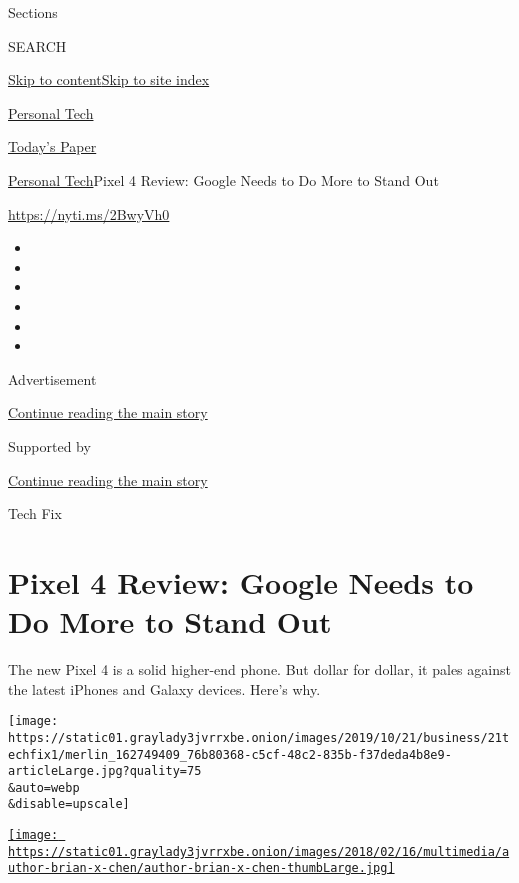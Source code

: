 Sections

SEARCH

\protect\hyperlink{site-content}{Skip to
content}\protect\hyperlink{site-index}{Skip to site index}

\href{https://www.nytimes3xbfgragh.onion/section/technology/personaltech}{Personal
Tech}

\href{https://myaccount.nytimes3xbfgragh.onion/auth/login?response_type=cookie\&client_id=vi}{}

\href{https://www.nytimes3xbfgragh.onion/section/todayspaper}{Today's
Paper}

\href{/section/technology/personaltech}{Personal Tech}\textbar{}Pixel 4
Review: Google Needs to Do More to Stand Out

\url{https://nyti.ms/2BwyVh0}

\begin{itemize}
\item
\item
\item
\item
\item
\item
\end{itemize}

Advertisement

\protect\hyperlink{after-top}{Continue reading the main story}

Supported by

\protect\hyperlink{after-sponsor}{Continue reading the main story}

Tech Fix

\hypertarget{pixel-4-review-google-needs-to-do-more-to-stand-out}{%
\section{Pixel 4 Review: Google Needs to Do More to Stand
Out}\label{pixel-4-review-google-needs-to-do-more-to-stand-out}}

The new Pixel 4 is a solid higher-end phone. But dollar for dollar, it
pales against the latest iPhones and Galaxy devices. Here's why.

\texttt{[image: https://static01.graylady3jvrrxbe.onion/images/2019/10/21/business/21techfix1/merlin\_162749409\_76b80368-c5cf-48c2-835b-f37deda4b8e9-articleLarge.jpg?quality=75\\\&auto=webp\\\&disable=upscale]}

\href{https://www.nytimes3xbfgragh.onion/by/brian-x-chen}{\texttt{[image: https://static01.graylady3jvrrxbe.onion/images/2018/02/16/multimedia/author-brian-x-chen/author-brian-x-chen-thumbLarge.jpg]}}

